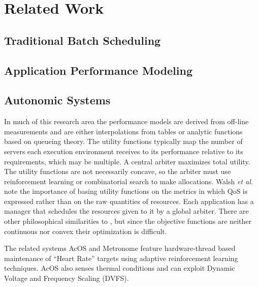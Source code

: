 \section{Related Work}\label{related_work}
\subsection*{Traditional Batch Scheduling}
\subsection*{Application Performance Modeling}

\subsection*{Autonomic Systems}
%	
%
%	
%
In much of this research area\cite{1078472,1078493,1285843,1345325}
the performance models are derived from off-line measurements and are either
interpolations from tables or analytic functions based on queueing theory.
The utility functions typically map the number of servers each execution environment receives
to its performance relative to its requirements, which may be multiple.
A central arbiter maximizes total utility. The utility functions are not necessarily concave,
so the arbiter must use reinforcement learning or combinatorial search to make allocations.
%
Walsh \emph{et al.}\cite{1078411} note the importance of basing utility functions
on the metrics in which QoS is expressed rather than on the raw quantities of resources.
Each application has a manager that schedules the resources given to it by a global arbiter.
There are other philosophical similarities to \pacora,
but since the objective functions are neither continuous nor convex their optimization is difficult.

%
%
The related systems AcOS\cite{AcOS} and Metronome\cite{Metronome} feature hardware-thread based maintenance of ``Heart Rate''
targets using adaptive reinforcement learning techniques.
AcOS also senses thermal conditions and can exploit Dynamic Voltage and Frequency Scaling (DVFS).

